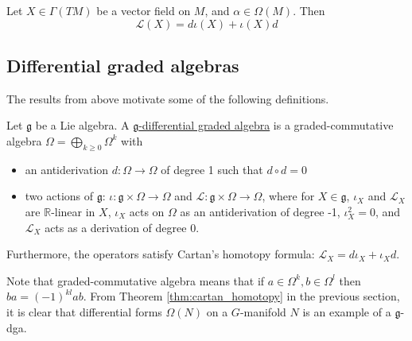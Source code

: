 \begin{thm} 
	\label{thm:cartan_homotopy} %
	Let $X\in \Gamma(TM)$ be a vector field on $M$, and $\alpha\in \Omega(M)$. Then
	\[
	\mathcal{L}(X) = d\iota(X)+\iota(X) d
	\] 
	\begin{comment}
	\begin{enumerate}[(i)]
	    \item $\mathcal{L}(X)d = d\mathcal{L}(X)$
		\item $\mathcal{L}(X)(\iota(Y)\alpha) = \iota([X,Y])\alpha +
			\iota(Y)(\mathcal{L}(X)\alpha)$ 
		\item Cartan's homotopy formula: $\mathcal{L}(X) = d
			\cdot\iota(X)+\iota(X)\cdot d$
	\end{enumerate}
	\end{comment}
\end{thm}


\subsection{Differential graded algebras}
The results from above motivate some of the following definitions.
\begin{defn}
	Let $\mathfrak{g}$ be a Lie algebra. A \underline{$\mathfrak{g}$-differential graded
	algebra} is a graded-commutative algebra $\Omega= \bigoplus_{k\geq
	0}\Omega^k$ with 
	\begin{itemize}
		\item an antiderivation $d:\Omega\to\Omega$ of degree 1 such that
	$d\circ d = 0$
		\item two actions of $\mathfrak{g}$: $\iota:\mathfrak{g}\times\Omega\to\Omega$
			and  $\mathcal{L}:\mathfrak{g}\times\Omega\to\Omega$, where for
			$X\in\mathfrak{g}$,  $\iota_X$ and  $\mathcal{L}_X$ are
			$\mathbb{R}$-linear in $X$,  $\iota_X$ acts on  $\Omega$ as an
			antiderivation of degree -1,  $\iota_X^2 = 0$, and  $\mathcal{L}_X$
			acts as a derivation of degree 0.
	\end{itemize}
	Furthermore, the operators satisfy Cartan's homotopy formula:
	$\mathcal{L}_X= d\iota_X+\iota_Xd$.
\end{defn}
Note that graded-commutative algebra means that if $a\in
\Omega^k,b\in\Omega^l$ then $ba = (-1)^{kl}ab$. 
From Theorem \ref{thm:cartan_homotopy} in the previous section, it is
clear that differential forms $\Omega(N)$ on a $G$-manifold  $N$ is an example
of a $\mathfrak{g}$-dga. 

